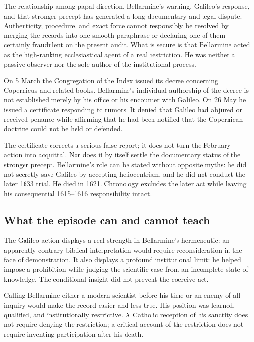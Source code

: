 The relationship among papal direction, Bellarmine's warning, Galileo's
response, and that stronger precept has generated a long documentary and legal
dispute.  Authenticity, procedure, and exact force cannot responsibly be
resolved by merging the records into one smooth paraphrase or declaring one
of them certainly fraudulent on the present audit.  What is secure is that
Bellarmine acted as the high-ranking ecclesiastical agent of a real
restriction.  He was neither a passive observer nor the sole author of the
institutional process.

On 5 March the Congregation of the Index issued its decree concerning
Copernicus and related books.  Bellarmine's individual authorship of the decree
is not established merely by his office or his encounter with Galileo.  On 26
May he issued a certificate responding to rumors.  It denied that Galileo had
abjured or received penance while affirming that he had been notified that the
Copernican doctrine could not be held or defended.

The certificate corrects a serious false report; it does not turn the February
action into acquittal.  Nor does it by itself settle the documentary status of
the stronger precept.  Bellarmine's role can be stated without opposite
myths: he did not secretly save Galileo by accepting heliocentrism, and he did
not conduct the later 1633 trial.  He died in 1621.  Chronology excludes the
later act while leaving his consequential 1615--1616 responsibility intact.

\subsection{What the episode can and cannot teach}

The Galileo action displays a real strength in Bellarmine's hermeneutic: an
apparently contrary biblical interpretation would require reconsideration in
the face of demonstration.  It also displays a profound institutional limit:
he helped impose a prohibition while judging the scientific case from an
incomplete state of knowledge.  The conditional insight did not prevent the
coercive act.

Calling Bellarmine either a modern scientist before his time or an enemy of
all inquiry would make the record easier and less true.  His position was
learned, qualified, and institutionally restrictive.  A Catholic reception of
his sanctity does not require denying the restriction; a critical account of
the restriction does not require inventing participation after his death.

